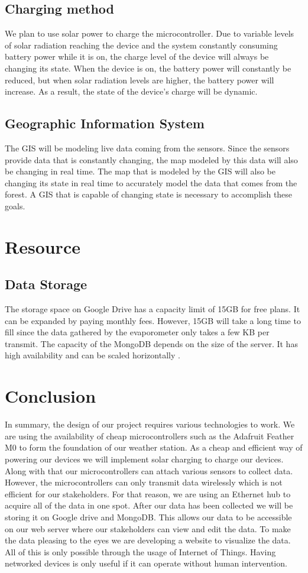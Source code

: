 \documentclass[onecolumn, draftclsnofoot,10pt, compsoc]{IEEEtran}
\begin{document}
\subsection{Charging method}
We plan to use solar power to charge the microcontroller. Due to variable levels of solar radiation reaching the device and the system constantly consuming battery power while it is on, the charge level of the device will always be changing its state. When the device is on, the battery power will constantly be reduced, but when solar radiation levels are higher, the battery power will increase. As a result, the state of the device’s charge will be dynamic.

\subsection{Geographic Information System}
The GIS will be modeling live data coming from the sensors. Since the sensors provide data that is constantly changing, the map modeled by this data will also be changing in real time. The map that is modeled by the GIS will also be changing its state in real time to accurately model the data that comes from the forest. A GIS that is capable of changing state is necessary to accomplish these goals.

\section{Resource}
\subsection{Data Storage}
The storage space on Google Drive has a capacity limit of 15GB for free plans. It can be expanded by paying monthly fees. However, 15GB will take a long time to fill since the data gathered by the evaporometer only takes a few KB per transmit. 
The capacity of the MongoDB depends on the size of the server. It has high availability and can be scaled horizontally \cite{t5}.

\section{Conclusion}
In summary, the design of our project requires various technologies to work.  We are using the availability of cheap microcontrollers such as the Adafruit Feather M0 to form the foundation of our weather station.   As a cheap and efficient way of powering our devices we will implement solar charging to charge our devices.  Along with that our microcontrollers can attach various sensors to collect data.  However, the microcontrollers can only transmit data wirelessly which is not efficient for our stakeholders. For that reason, we are using an Ethernet hub to acquire all of the data in one spot.   After our data has been collected we will be storing it on Google drive and MongoDB.  This allows our data to be accessible on our web server where our stakeholders can view and edit the data.  To make the data pleasing to the eyes we are developing a website to visualize the data.  All of this is only possible through the usage of Internet of Things.  Having networked devices is only useful if it can operate without human intervention.
\end{document}
